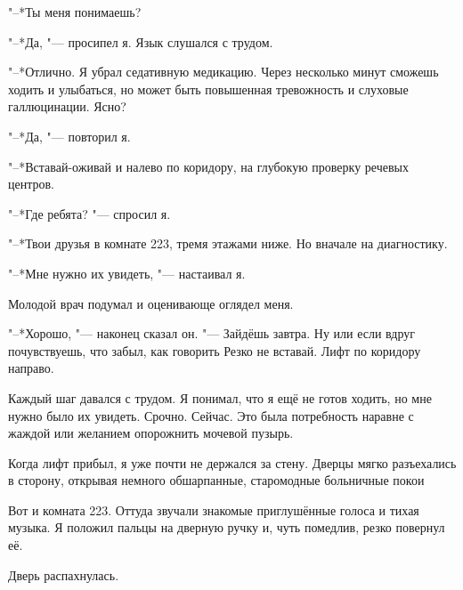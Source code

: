 \documentclass[a4paper,12pt,fleqn]{book}
\newcommand{\ldotst}{\so{...}\xspace}
\begin{document}
"--*Ты меня понимаешь?

"--*Да, "--- просипел я.
Язык слушался с трудом.

"--*Отлично.
Я убрал седативную медикацию.
Через несколько минут сможешь ходить и улыбаться, но может быть повышенная тревожность и слуховые галлюцинации.
Ясно?

"--*Да, "--- повторил я.

"--*Вставай-оживай и налево по коридору, на глубокую проверку речевых центров.

"--*Где ребята? "--- спросил я.

"--*Твои друзья в комнате 223, тремя этажами ниже.
Но вначале на диагностику.

"--*Мне нужно их увидеть, "--- настаивал я.

Молодой врач подумал и оценивающе оглядел меня.

"--*Хорошо, "--- наконец сказал он.
"--- Зайдёшь завтра.
Ну или если вдруг почувствуешь, что забыл, как говорить\ldotst
Резко не вставай.
Лифт по коридору направо.

Каждый шаг давался с трудом.
Я понимал, что я ещё не готов ходить, но мне нужно было их увидеть.
Срочно.
Сейчас.
Это была потребность наравне с жаждой или желанием опорожнить мочевой пузырь.

Когда лифт прибыл, я уже почти не держался за стену.
Дверцы мягко разъехались в сторону, открывая немного обшарпанные, старомодные больничные покои\ldotst

Вот и комната 223.
Оттуда звучали знакомые приглушённые голоса и тихая музыка.
Я положил пальцы на дверную ручку и, чуть помедлив, резко повернул её.

Дверь распахнулась.
\end{document}
